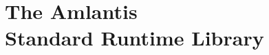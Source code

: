 
\part[The Amlantis Standard Runtime Library]{The Amlantis \\Standard Runtime Library}
\label{part:library}

